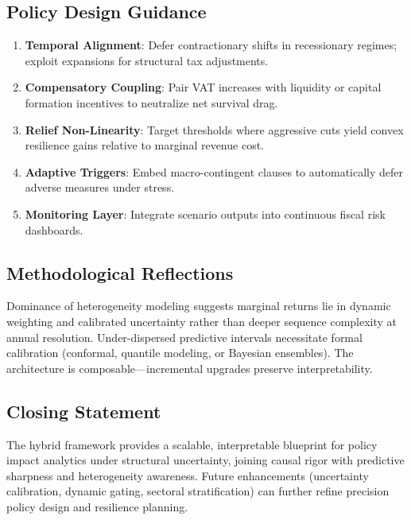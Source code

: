 \subsection{Policy Design Guidance}
\begin{enumerate}
  \item \textbf{Temporal Alignment}: Defer contractionary shifts in recessionary regimes; exploit expansions for structural tax adjustments.
  \item \textbf{Compensatory Coupling}: Pair VAT increases with liquidity or capital formation incentives to neutralize net survival drag.
  \item \textbf{Relief Non-Linearity}: Target thresholds where aggressive cuts yield convex resilience gains relative to marginal revenue cost.
  \item \textbf{Adaptive Triggers}: Embed macro-contingent clauses to automatically defer adverse measures under stress.
  \item \textbf{Monitoring Layer}: Integrate scenario outputs into continuous fiscal risk dashboards.
\end{enumerate}

\subsection{Methodological Reflections}
Dominance of heterogeneity modeling suggests marginal returns lie in dynamic weighting and calibrated uncertainty rather than deeper sequence complexity at annual resolution. Under-dispersed predictive intervals necessitate formal calibration (conformal, quantile modeling, or Bayesian ensembles). The architecture is composable—incremental upgrades preserve interpretability.

\subsection{Closing Statement}
The hybrid framework provides a scalable, interpretable blueprint for policy impact analytics under structural uncertainty, joining causal rigor with predictive sharpness and heterogeneity awareness. Future enhancements (uncertainty calibration, dynamic gating, sectoral stratification) can further refine precision policy design and resilience planning.

